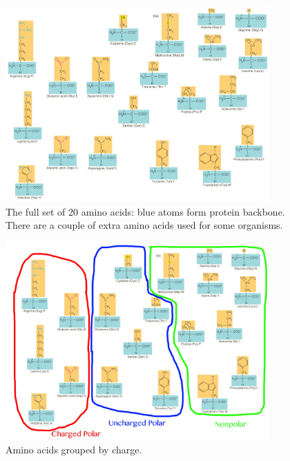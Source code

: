 \documentclass[]{article}
\begin{document}
\cite[25.9 Proteins]{brown2009chemistry}

\begin{figure}[H]
	\caption[The full set of 20 amino acids]{The full set of 20 amino acids: blue atoms form protein backbone. There are a couple of extra amino acids used for some organisms.}\label{fig:AminoAcids} 
	\includegraphics[width=0.9\textwidth]{AminoAcids}
\end{figure}

\begin{figure}[H]
	\caption{Amino acids grouped by charge.}\label{fig:AminoAcidsGrouped} 
	\includegraphics[width=0.9\textwidth]{AminoAcidsGrouped}
\end{figure}
\end{document}
